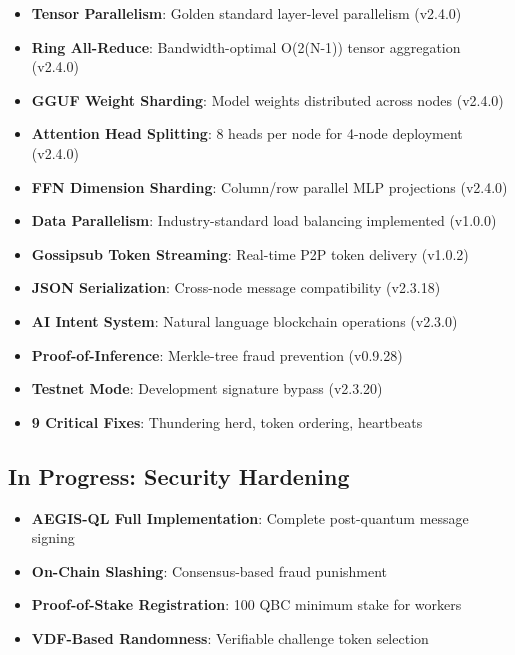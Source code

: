 \documentclass[11pt,a4paper]{article}
\begin{document}
\begin{itemize}
    \item \checkmark \textbf{Tensor Parallelism}: Golden standard layer-level parallelism (v2.4.0)
    \item \checkmark \textbf{Ring All-Reduce}: Bandwidth-optimal O(2(N-1)) tensor aggregation (v2.4.0)
    \item \checkmark \textbf{GGUF Weight Sharding}: Model weights distributed across nodes (v2.4.0)
    \item \checkmark \textbf{Attention Head Splitting}: 8 heads per node for 4-node deployment (v2.4.0)
    \item \checkmark \textbf{FFN Dimension Sharding}: Column/row parallel MLP projections (v2.4.0)
    \item \checkmark \textbf{Data Parallelism}: Industry-standard load balancing implemented (v1.0.0)
    \item \checkmark \textbf{Gossipsub Token Streaming}: Real-time P2P token delivery (v1.0.2)
    \item \checkmark \textbf{JSON Serialization}: Cross-node message compatibility (v2.3.18)
    \item \checkmark \textbf{AI Intent System}: Natural language blockchain operations (v2.3.0)
    \item \checkmark \textbf{Proof-of-Inference}: Merkle-tree fraud prevention (v0.9.28)
    \item \checkmark \textbf{Testnet Mode}: Development signature bypass (v2.3.20)
    \item \checkmark \textbf{9 Critical Fixes}: Thundering herd, token ordering, heartbeats
\end{itemize}

\subsection{In Progress: Security Hardening}

\begin{itemize}
    \item \textbf{AEGIS-QL Full Implementation}: Complete post-quantum message signing
    \item \textbf{On-Chain Slashing}: Consensus-based fraud punishment
    \item \textbf{Proof-of-Stake Registration}: 100 QBC minimum stake for workers
    \item \textbf{VDF-Based Randomness}: Verifiable challenge token selection
\end{itemize}
\end{document}

